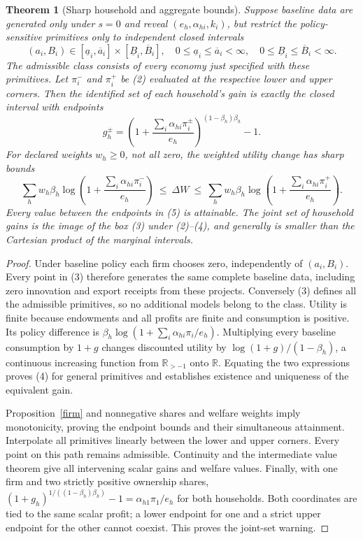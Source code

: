 \documentclass[11pt]{article}
\newtheorem{theorem}{Theorem}
\newcommand{\R}{\mathbb R}
\begin{document}
\begin{theorem}[Sharp household and aggregate bounds]\label{bounds}
Suppose baseline data are generated only under $s=0$ and reveal
$(e_h,\alpha_{hi},k_i)$, but restrict the policy-sensitive primitives only to
independent closed intervals
\[
 (a_i,B_i)\in[\underline a_i,\overline a_i]
                  \times[\underline B_i,\overline B_i],
 \quad 0\leq\underline a_i\leq\overline a_i<\infty,
 \quad0\leq\underline B_i\leq\overline B_i<\infty.                \tag{3}
\]
The admissible class consists of every economy just specified with these
primitives. Let $\pi_i^-$ and $\pi_i^+$ be (2) evaluated at the respective
lower and upper corners. Then the identified set of each household's gain
is exactly the closed interval with endpoints
\[
 g_h^\pm=
 \left(1+\frac{\sum_i\alpha_{hi}\pi_i^\pm}{e_h}\right)^{(1-\beta_h)\beta_h}-1.
                                                                    \tag{4}
\]
For declared weights $w_h\geq0$, not all zero, the weighted utility change
has sharp bounds
\[
 \sum_h w_h\beta_h\log\left(1+
       \frac{\sum_i\alpha_{hi}\pi_i^-}{e_h}\right)
 \ \leq\ \Delta W\ \leq\
 \sum_h w_h\beta_h\log\left(1+
       \frac{\sum_i\alpha_{hi}\pi_i^+}{e_h}\right).              \tag{5}
\]
Every value between the endpoints in (5) is attainable. The joint set of
household gains is the image of the box (3) under (2)--(4), and generally
is smaller than the Cartesian product of the marginal intervals.
\end{theorem}
\begin{proof}
Under baseline policy each firm chooses zero, independently of $(a_i,B_i)$.
Every point in (3) therefore generates the same complete baseline data,
including zero innovation and export receipts from these projects.
Conversely (3) defines all the admissible primitives, so no additional
models belong to the class. Utility is finite because endowments and all
profits are finite and consumption is positive. Its policy difference is
$\beta_h\log(1+\sum_i\alpha_{hi}\pi_i/e_h)$.
Multiplying every baseline consumption by $1+g$ changes discounted utility
by $\log(1+g)/(1-\beta_h)$, a continuous increasing function from $\R_{>-1}$
onto $\R$. Equating the two expressions proves (4) for general primitives
and establishes existence and uniqueness of the equivalent gain.

Proposition~\ref{firm} and nonnegative shares and welfare weights imply
monotonicity, proving the endpoint bounds and their simultaneous
attainment. Interpolate all primitives linearly between the lower and upper
corners. Every point on this path remains admissible. Continuity and the
intermediate value theorem give all intervening scalar gains and welfare
values. Finally, with one firm and two strictly positive ownership shares,
$(1+g_h)^{1/((1-\beta_h)\beta_h)}-1=\alpha_{h1}\pi_1/e_h$ for both
households. Both coordinates are tied to the same scalar profit; a lower
endpoint for one and a strict upper endpoint for the other cannot coexist.
This proves the joint-set warning.
\end{proof}
\end{document}
